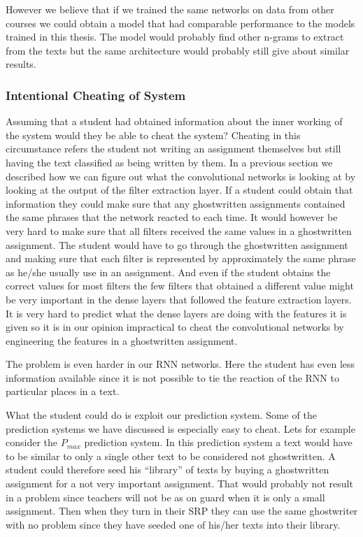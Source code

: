 However we believe that if we trained the same networks on data from other
courses we could obtain a model that had comparable performance to the models
trained in this thesis. The model would probably find other n-grams to extract
from the texts but the same architecture would probably still give about similar
results.


\subsubsection{Intentional Cheating of System}

Assuming that a student had obtained information about the inner working of the
system would they be able to cheat the system? Cheating in this circumstance
refers the student not writing an assignment themselves but still having the
text classified as being written by them. In a previous section we described
how we can figure out what the convolutional networks is looking at by looking
at the output of the filter extraction layer. If a student could obtain that
information they could make sure that any ghostwritten assignments contained the
same phrases that the network reacted to each time. It would however be very
hard to make sure that all filters received the same values in a ghostwritten
assignment. The student would have to go through the ghostwritten assignment and
making sure that each filter is represented by approximately the same phrase as
he/she usually use in an assignment. And even if the student obtains the correct
values for most filters the few filters that obtained a different value might be
very important in the dense layers that followed the feature extraction layers.
It is very hard to predict what the dense layers are doing with the features it
is given so it is in our opinion impractical to cheat the convolutional networks
by engineering the features in a ghostwritten assignment.

The problem is even harder in our \gls{RNN} networks. Here the student has even
less information available since it is not possible to tie the reaction of the
\gls{RNN} to particular places in a text.

What the student could do is exploit our prediction system. Some of the
prediction systems we have discussed is especially easy to cheat. Lets for
example consider the $P_{max}$ prediction system. In this prediction system a
text would have to be similar to only a single other text to be considered not
ghostwritten. A student could therefore seed his ``library'' of texts by buying
a ghostwritten assignment for a not very important assignment. That would
probably not result in a problem since teachers will not be as on guard when
it is only a small assignment. Then when they turn in their \gls{SRP} they can
use the same ghostwriter with no problem since they have seeded one of his/her
texts into their library.


